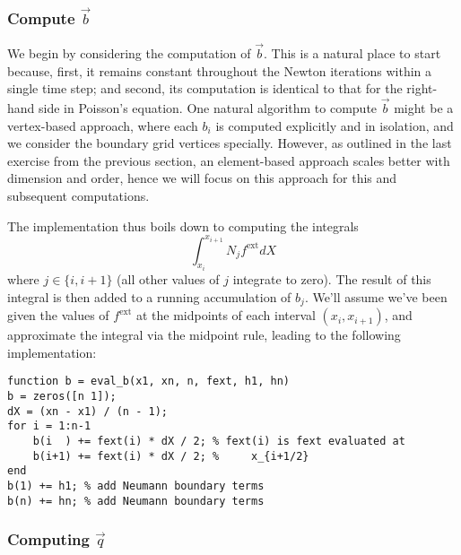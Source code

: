 \subsubsection{Compute $\vec{b}$}

We begin by considering the computation of $\vec{b}$. This is a natural place to start because, first, it remains constant throughout the Newton iterations within a single time step; and second, its computation is identical to that for the right-hand side in Poisson's equation. One natural algorithm to compute $\vec{b}$ might be a vertex-based approach, where each $b_i$ is computed explicitly and in isolation, and we consider the boundary grid vertices specially. However, as outlined in the last exercise from the previous section, an element-based approach scales better with dimension and order, hence we will focus on this approach for this and subsequent computations.

The implementation thus boils down to computing the integrals
\begin{equation*}
\int_{x_i}^{x_{i+1}} N_j f^{\text{ext}} dX
\end{equation*}
where $j \in \{i, i+1\}$ (all other values of $j$ integrate to zero). The result of this integral is then added to a running accumulation of $b_j$. We'll assume we've been given the values of $f^{\text{ext}}$ at the midpoints of each interval $\left( x_i, x_{i+1} \right)$, and approximate the integral via the midpoint rule, leading to the following implementation:

\begin{verbatim}
function b = eval_b(x1, xn, n, fext, h1, hn)
b = zeros([n 1]);
dX = (xn - x1) / (n - 1);
for i = 1:n-1
    b(i  ) += fext(i) * dX / 2; % fext(i) is fext evaluated at
    b(i+1) += fext(i) * dX / 2; %     x_{i+1/2}
end
b(1) += h1; % add Neumann boundary terms
b(n) += hn; % add Neumann boundary terms
\end{verbatim}

\subsubsection{Computing $\vec{q}$}

